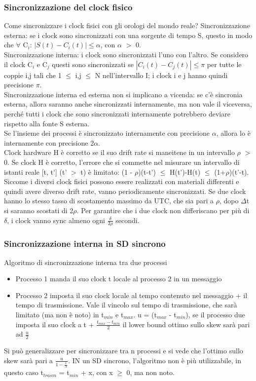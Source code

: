 \documentclass[16px]{article}
\begin{document}
\subsubsection{Sincronizzazione del clock fisico}
Come sincronizzare i clock fisici con gli orologi del mondo reale? Sincronizzazione esterna: se i clock sono sincronizzati con una sorgente di tempo S, questo in modo che $\forall$ C$_i$: $|S(t) - C_i(t)| \leq \alpha$, con $\alpha$ $>$ 0.\\ Sincronizzazione interna: i clock sono sincronizzati l'uno con l'altro. Se considero il clock C$_i$ e C$_j$ questi sono sincronizzati se $|C_i(t) - C_j(t)| \leq \pi$ per tutte le coppie i,j tali che 1 $\leq$ i,j $\leq$ N nell'intervallo I; i clock i e j hanno quindi precisione $\pi$.\\ Sincronizzazione interna ed esterna non si implicano a vicenda: se c'è sincronia esterna, allora saranno anche sincronizzati internamente, ma non vale il viceversa, perché tutti i clock che sono sincronizzati internamente potrebbero deviare rispetto alla fonte S esterna.\\ Se l'insieme dei processi è sincronizzato internamente con precisione $\alpha$, allora lo è internamente con precisione 2$\alpha$.\\ Clock hardware H è corretto se il suo drift rate si maneitene in un intervallo $\rho$ $>$ 0. Se clock H è corretto, l'errore che si commette nel misurare un intervallo di istanti reale [t, t'] (t' $>$ t) è limitato: (1 - $\rho$)(t-t') $\leq$ H(t')-H(t) $\leq$ (1+$\rho$)(t'-t).\\ Siccome i diversi clock fisici possono essere realizzati con materiali differenti e quindi avere diverso drift rate, vanno periodicamente sincronizzati. Se due clock hanno lo stesso tasso di scostamento massimo da UTC, che sia pari a $\rho$, dopo $\Delta$t si saranno scostati di 2$\rho$. Per garantire che i due clock non differiscano per più di $\delta$, i clock vanno sync almeno ogni $\frac{\delta}{2\rho}$ secondi.
\subsubsection{Sincronizzazione interna in SD sincrono}
Algoritmo di sincronizzazione interna tra due processi
\begin{itemize}
\item Processo 1 manda il suo clock t locale al processo 2 in un messaggio
\item Processo 2 imposta il suo clock locale al tempo contenuto nel messaggio + il tempo di trasmissione. Vale il vincolo sul tempo di trasmissione, che sarà limitato (ma non è noto) in t$_{min}$ e t$_{max}$. u = (t$_{max}$ - t$_{min}$), se il processo due imposta il suo clock a t + $\frac{t_{max} - t_{min}}{2}$ il lower bound ottimo sullo skew sarà pari ad $\frac{u}{2}$
\end{itemize}
Si può generalizzare per sincronizzare tra n processi e si vede che l'ottimo sullo skew sarà pari a $\frac{u}{1 - \frac{1}{N}}$. IN un SD sincrono, l'algoritmo non è più utilizzabile, in questo caso t$_{trasm}$ = t$_{min}$ + x, con x $\geq$ 0, ma non noto.
\end{document}
